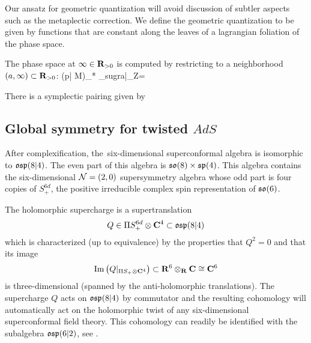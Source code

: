 Our ansatz for geometric quantization will avoid discussion of subtler aspects such as the metaplectic correction. We define the geometric quantization to be given by functions that are constant along the leaves of a lagrangian foliation of the phase space.

The phase space at $\infty\in \mathbf{R}_{>0}$ is computed by restricting to a neighborhood $(a, \infty)\subset \mathbf{R}_{>0}$:
\beqn
(p| \mathring M)_* \cL_{sugra}|_{\infty \times Z}=
\eeqn

There is a symplectic pairing given by
\beqn
\eeqn



\subsection{Global symmetry for twisted $AdS$}
\label{s:global1}

After complexification, the~six-dimensional superconformal algebra is isomorphic to $\mathfrak{osp}(8|4)$.
The even part of this algebra is $\mathfrak{so}(8) \times \mathfrak{sp}(4)$.
This algebra contains the six-dimensional $\mathcal N=(2,0)$ supersymmetry algebra whose odd part is four copies of $S^{6d}_+$, the positive irreducible complex spin representation of $\mathfrak{so}(6)$.

The holomorphic supercharge is a supertranslation
\[
Q \in \Pi S^{6d}_+ \otimes \mathbf{C}^4 \subset \mathfrak{osp}(8|4)
\]
which is characterized (up to equivalence) by the properties that $Q^2 = 0$ and that its image
\[
{\rm Im}\left(Q|_{\Pi S_+ \otimes \mathbf{C}^4} \right) \subset \mathbf{R}^6 \otimes_{\mathbf{R}} \mathbf{C} \cong \mathbf{C}^6
\]
is three-dimensional (spanned by the anti-holomorphic translations). 
The supercharge $Q$ acts on $\mathfrak{osp}(8|4)$ by commutator and the resulting cohomology will automatically act on the holomorphic twist of any six-dimensional superconformal field theory. 
This cohomology can readily be identified with the subalgebra $\mathfrak{osp}(6|2)$, see \cite{SWe36}. 


